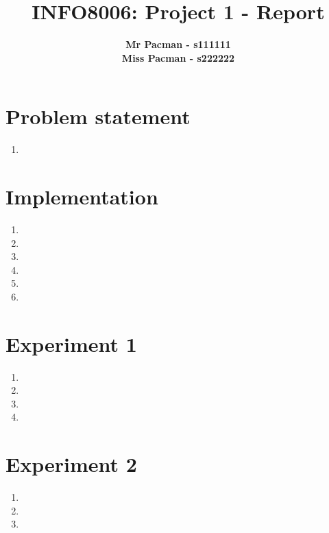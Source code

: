 \documentclass{article}
\begin{document}

\title{\Large{INFO8006: Project 1 - Report}}
\vspace{1cm}
\author{\small{\bf Mr Pacman - s111111} \\ \small{\bf Miss Pacman - s222222}}

\maketitle


\section{Problem statement}

\begin{enumerate}[label=\alph*.]
    \item
\end{enumerate}

\section{Implementation}

\begin{enumerate}[label=\alph*.]
    \item
    \item
    \item
    \item
    \item
    \item
\end{enumerate}

\section{Experiment 1}

\begin{enumerate}[label=\alph*.]
    \item
    \item
    \item
    \item
\end{enumerate}

\section{Experiment 2}

\begin{enumerate}[label=\alph*.]
    \item
    \item
    \item
\end{enumerate}


\end{document}
